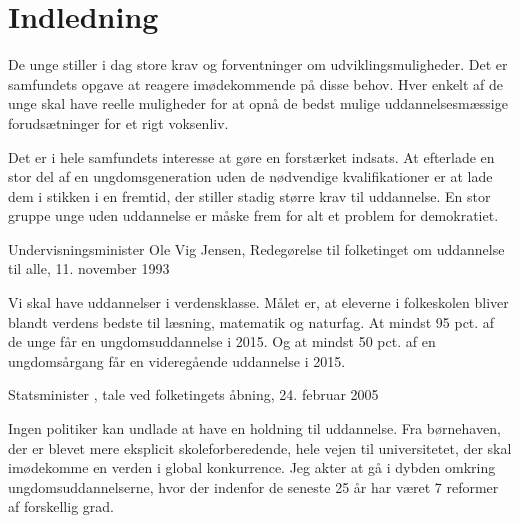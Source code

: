 \section{Indledning}

\epigraph{
De unge stiller i dag store krav og forventninger om udviklingsmuligheder.
Det er samfundets opgave at reagere imødekommende på disse behov.
Hver enkelt af de unge skal have
reelle muligheder for at opnå de bedst mulige uddannelsesmæssige forudsætninger for et rigt voksenliv.

Det er i hele samfundets interesse at gøre en forstærket indsats.
At efterlade en stor del af en ungdomsgeneration uden de nødvendige kvalifikationer er at lade dem i stikken i en fremtid, der stiller stadig større krav til uddannelse.
En stor gruppe unge uden uddannelse er måske frem for alt et problem for demokratiet.
}
{Undervisningsminister Ole Vig Jensen, Redegørelse til folketinget om uddannelse til alle, 11. november 1993}

\epigraph{
Vi skal have uddannelser i verdensklasse. Målet er, at eleverne i folkeskolen bliver blandt verdens bedste til læsning, matematik og naturfag. At mindst 95 pct. af de unge får en ungdomsuddannelse i 2015. Og at mindst 50 pct. af en ungdomsårgang får en videregående uddannelse i 2015.
}
{Statsminister , tale ved folketingets åbning, 24. februar 2005}



Ingen politiker kan undlade at have en holdning til uddannelse.
Fra børnehaven, der er blevet mere eksplicit skoleforberedende, hele vejen til universitetet, der skal imødekomme en verden i global konkurrence.
Jeg akter at gå i dybden omkring ungdomsuddannelserne, hvor der indenfor de seneste 25 år har været 7 reformer af forskellig grad.

